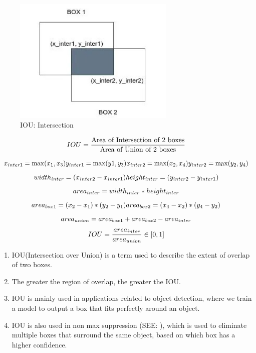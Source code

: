 \begin{table}[H]
\begin{minipage}[b]{0.325\linewidth}
    \end{minipage}
    \hfill
    \begin{minipage}[b]{0.325\linewidth}
        \begin{figure}[H]
            \centering
            \includegraphics[width=\linewidth, height=6cm, keepaspectratio]{Pictures/ds-algo/iou-4.jpg}
            \caption{IOU: Intersection}
        \end{figure}
    \end{minipage}
\end{table}

\[
    \hfill
    \displaystyle IOU = \dfrac{\text{Area of Intersection of 2 boxes}}{\text{Area of Union of 2 boxes}}
    \hfill
\]

\begin{adjustwidth}{-2cm}{-2cm}

\[
    x_{inter1} = \max(x_1, x_3) 
    \hfill 
    y_{inter1} = \max(y1, y_3)
    \hfill
    x_{inter2} = \max(x_2, x_4) 
    \hfill 
    y_{inter2} = \max(y_2, y_4)
    \hfill
\]
\[
    width_{inter} = (x_{inter2} - x_{inter1})
    \hfill
    height_{inter} = (y_{inter2} - y_{inter1})
    \hfill
\]
\[
    area_{inter} = width_{inter} * height_{inter}
    \hfill
\]
\[
    area_{box1} = (x_2 - x_1) * (y_2 - y_1)
    \hfill
    area_{box2} = (x_4 - x_2) * (y_4 - y_2)
    \hfill
\]
\[
    area_{union} = area_{box1} + area_{box2} - area_{inter}
    \hfill
\]
\[
    IOU = \dfrac{area_{inter}}{area_{union}} \in [0,1]
    \hfill
\]

\end{adjustwidth}

\begin{enumerate}
    \item IOU(Intersection over Union) is a term used to describe the extent of overlap of two boxes. 
    
    \item The greater the region of overlap, the greater the IOU.

    \item IOU is mainly used in applications related to object detection, where we train a model to output a box that fits perfectly around an object.

    \item IOU is also used in non max suppression (SEE: ), which is used to eliminate multiple boxes that surround the same object, based on which box has a higher confidence.
\end{enumerate}





